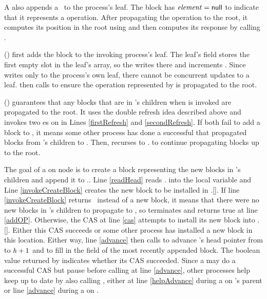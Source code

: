 A  also appends a \block\ to the process's leaf.
The block has $\mbox{\textit{element}}=\mbox{\sf null}$ to indicate that it represents a  operation.
After propagating the operation to the root, it computes
its position in the root using
 and then computes its response by calling . 

() first adds the block  to the invoking process's leaf.
The leaf's  field stores the first empty slot in the leaf's  array,
so the  writes  there and increments .
Since  writes only to the process's own leaf, there cannot be concurrent updates to a leaf.
 then calls  to ensure the operation represented by  is propagated to the root.

() guarantees that any blocks that are in 's children when  is invoked are propagated to the root.
It uses the double refresh idea described
above and invokes two es on  in Lines
\ref{firstRefresh} and \ref{secondRefresh}. 
If both fail to add a block to , it means some other process has done a successful 
that propagated blocks from 's children to .
Then,  recurses to . to continue propagating blocks up to the root.  

The goal of a  on node  is to create a block representing the new blocks
in 's
children and append it to .. 
Line \ref{readHead} reads . into the local variable 
and Line \ref{invokeCreateBlock} creates the new block to be installed in .[].
If line \ref{invokeCreateBlock} returns \nl\ instead of a new block, it means that there were no new blocks in 's children to propagate to ,
so  terminates and returns true at line \ref{addOP}.
Otherwise, the CAS at line \ref{cas} attempts to install its new block into .[].
Either this CAS succeeds or some other process has installed a new block in this location.
Either way, line \ref{advance} then calls  to advance 's head pointer 
from  to $\mbox{\textit{h}}+1$
and to fill in the  field of the most recently appended block.
The boolean value returned by  indicates whether its CAS succeeded.
Since a  may do a successful CAS but pause before calling  at line \ref{advance},
other processes help keep  up to date by also calling , 
either at line \ref{helpAdvance} during a  on 's parent or line \ref{advance} during a  on .

